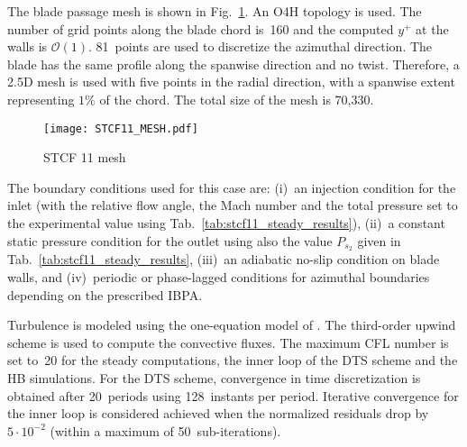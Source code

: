 
The blade passage mesh is shown in Fig.~\ref{fig:stcf11_mesh}.
An O4H topology is used.
The number of grid points along the blade
chord is~160 and the computed $y^+$ at the walls is $\mathcal{O}(1)$.
81~points are used to discretize the azimuthal direction.
The blade has the same profile along the spanwise direction and no
twist. Therefore, a 2.5D mesh is used with five points 
in the radial direction, with a spanwise
extent representing $1\%$ of the chord. 
The total size of the mesh is 70,330.
\begin{figure}[htb!]
  \centering
  \texttt{[image: STCF11\_MESH.pdf]}
  \caption{STCF 11 mesh}
  \label{fig:stcf11_mesh}
\end{figure}

The boundary conditions used for this case are: (i)~an
injection condition  for the inlet (with the relative flow angle,
the Mach number and the total pressure
set to the experimental value using Tab.~\ref{tab:stcf11_steady_results}), 
(ii)~a constant static pressure
condition for the outlet using also the value $P_{s_2}$
given in Tab.~\ref{tab:stcf11_steady_results},  
(iii)~an adiabatic no-slip condition on
blade walls, and (iv)~periodic or phase-lagged conditions 
for azimuthal boundaries depending on the  
prescribed IBPA.

Turbulence is modeled using the one-equation model of
\citet{Spalart1992}.  The third-order upwind \citet{Roe1981}
scheme is used to compute the convective fluxes.
The maximum
CFL number is set to~20 for the steady computations,  the inner loop
of the DTS scheme and the HB simulations.  For the DTS scheme,  
convergence in time discretization is obtained
after 20~periods using 128~instants per period.  Iterative convergence 
for the inner loop is considered achieved when the normalized
residuals drop by $5\cdot 10^{-2}$ (within a maximum of
50~sub-iterations).


